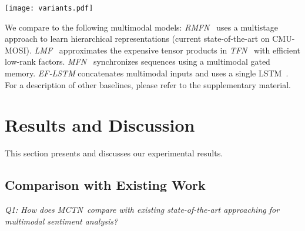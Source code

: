 \documentclass[letterpaper]{article} %
\newcommand{\citep}{\cite}
\newcommand{\ours}{MCTN}
\begin{document}
\begin{figure*}[ht]
\centering
\texttt{[image: variants.pdf]}
\caption{
\small
{Variations of our models: 
(a) \ours \ Bimodal with cyclic translation, 
(b) Simple Bimodal without cyclic translation, 
(c) No-Cycle Bimodal with different inputs of the same modality pair, and without cyclic translation, 
(d) Double Bimodal for two modalities without cyclic translation, with two different inputs (of the same pair), 
(e) \ours \ Trimodal with input from (a),
(f) Simple Trimodal for three modalities, with input as a joint representation taken from previous \ours \ for two modalities from (b) or (c), 
(g) Double Trimodal with input from (d), 
(h) Concat Trimodal which is similar to (b) but with input as the concatenation of 2 modalities, 
(i) Paired Trimodal using one encoder and 2 separate decoders for modality translations.
\textit{Legend}: black modality is ground truth, red (``hat'') modality represents translated output, blue (``hat'') modality is target output from previous translation outputs, and yellow box denotes concatenation.}
}
\label{fig:variants}
\end{figure*}
\addtocounter{figure}{-1}

We compare to the following multimodal models: \textit{RMFN}~\citep{multistage} uses a multistage approach to learn hierarchical representations (current state-of-the-art on CMU-MOSI). \textit{LMF}~\citep{lowrank} approximates the expensive tensor products in \textit{TFN}~\citep{tensoremnlp17} with efficient low-rank factors. \textit{MFN}~\citep{zadeh2018memory} synchronizes sequences using a multimodal gated memory. \textit{EF-LSTM} concatenates multimodal inputs and uses a single LSTM~\citep{Hochreiter:1997:LSM:1246443.1246450}. For a description of other baselines, please refer to the supplementary material.

\section{Results and Discussion} \label{sec:Results}

This section presents and discusses our experimental results.

\subsection{Comparison with Existing Work}

\textit{Q1: 
How does \ours \ compare with existing state-of-the-art approaching for multimodal sentiment analysis?}
\end{document}
